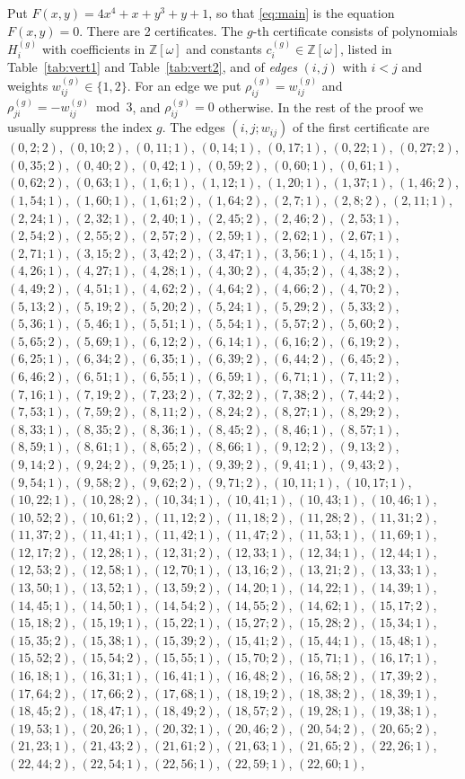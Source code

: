 \documentclass[11pt]{article}
\newcommand{\Z}{\mathbb{Z}}
\begin{document}
Put $F(x,y)=4x^{4}+x+y^{3}+y+1$, so that \eqref{eq:main} is the equation $F(x,y)=0$. There are 2 certificates. The $g$-th certificate consists of polynomials $H^{(g)}_i$ with coefficients in $\Z[\omega]$ and constants $c^{(g)}_i\in\Z[\omega]$, listed in Table~\ref{tab:vert1} and Table~\ref{tab:vert2}, and of \emph{edges} $(i,j)$ with $i<j$ and weights $w^{(g)}_{ij}\in\{1,2\}$. For an edge we put $\rho^{(g)}_{ij}=w^{(g)}_{ij}$ and $\rho^{(g)}_{ji}=-w^{(g)}_{ij}\bmod3$, and $\rho^{(g)}_{ij}=0$ otherwise. In the rest of the proof we usually suppress the index $g$.
The edges $(i,j;w_{ij})$ of the first certificate are $(0,2;2)$, $(0,10;2)$, $(0,11;1)$, $(0,14;1)$, $(0,17;1)$, $(0,22;1)$, $(0,27;2)$, $(0,35;2)$, $(0,40;2)$, $(0,42;1)$, $(0,59;2)$, $(0,60;1)$, $(0,61;1)$, $(0,62;2)$, $(0,63;1)$, $(1,6;1)$, $(1,12;1)$, $(1,20;1)$, $(1,37;1)$, $(1,46;2)$, $(1,54;1)$, $(1,60;1)$, $(1,61;2)$, $(1,64;2)$, $(2,7;1)$, $(2,8;2)$, $(2,11;1)$, $(2,24;1)$, $(2,32;1)$, $(2,40;1)$, $(2,45;2)$, $(2,46;2)$, $(2,53;1)$, $(2,54;2)$, $(2,55;2)$, $(2,57;2)$, $(2,59;1)$, $(2,62;1)$, $(2,67;1)$, $(2,71;1)$, $(3,15;2)$, $(3,42;2)$, $(3,47;1)$, $(3,56;1)$, $(4,15;1)$, $(4,26;1)$, $(4,27;1)$, $(4,28;1)$, $(4,30;2)$, $(4,35;2)$, $(4,38;2)$, $(4,49;2)$, $(4,51;1)$, $(4,62;2)$, $(4,64;2)$, $(4,66;2)$, $(4,70;2)$, $(5,13;2)$, $(5,19;2)$, $(5,20;2)$, $(5,24;1)$, $(5,29;2)$, $(5,33;2)$, $(5,36;1)$, $(5,46;1)$, $(5,51;1)$, $(5,54;1)$, $(5,57;2)$, $(5,60;2)$, $(5,65;2)$, $(5,69;1)$, $(6,12;2)$, $(6,14;1)$, $(6,16;2)$, $(6,19;2)$, $(6,25;1)$, $(6,34;2)$, $(6,35;1)$, $(6,39;2)$, $(6,44;2)$, $(6,45;2)$, $(6,46;2)$, $(6,51;1)$, $(6,55;1)$, $(6,59;1)$, $(6,71;1)$, $(7,11;2)$, $(7,16;1)$, $(7,19;2)$, $(7,23;2)$, $(7,32;2)$, $(7,38;2)$, $(7,44;2)$, $(7,53;1)$, $(7,59;2)$, $(8,11;2)$, $(8,24;2)$, $(8,27;1)$, $(8,29;2)$, $(8,33;1)$, $(8,35;2)$, $(8,36;1)$, $(8,45;2)$, $(8,46;1)$, $(8,57;1)$, $(8,59;1)$, $(8,61;1)$, $(8,65;2)$, $(8,66;1)$, $(9,12;2)$, $(9,13;2)$, $(9,14;2)$, $(9,24;2)$, $(9,25;1)$, $(9,39;2)$, $(9,41;1)$, $(9,43;2)$, $(9,54;1)$, $(9,58;2)$, $(9,62;2)$, $(9,71;2)$, $(10,11;1)$, $(10,17;1)$, $(10,22;1)$, $(10,28;2)$, $(10,34;1)$, $(10,41;1)$, $(10,43;1)$, $(10,46;1)$, $(10,52;2)$, $(10,61;2)$, $(11,12;2)$, $(11,18;2)$, $(11,28;2)$, $(11,31;2)$, $(11,37;2)$, $(11,41;1)$, $(11,42;1)$, $(11,47;2)$, $(11,53;1)$, $(11,69;1)$, $(12,17;2)$, $(12,28;1)$, $(12,31;2)$, $(12,33;1)$, $(12,34;1)$, $(12,44;1)$, $(12,53;2)$, $(12,58;1)$, $(12,70;1)$, $(13,16;2)$, $(13,21;2)$, $(13,33;1)$, $(13,50;1)$, $(13,52;1)$, $(13,59;2)$, $(14,20;1)$, $(14,22;1)$, $(14,39;1)$, $(14,45;1)$, $(14,50;1)$, $(14,54;2)$, $(14,55;2)$, $(14,62;1)$, $(15,17;2)$, $(15,18;2)$, $(15,19;1)$, $(15,22;1)$, $(15,27;2)$, $(15,28;2)$, $(15,34;1)$, $(15,35;2)$, $(15,38;1)$, $(15,39;2)$, $(15,41;2)$, $(15,44;1)$, $(15,48;1)$, $(15,52;2)$, $(15,54;2)$, $(15,55;1)$, $(15,70;2)$, $(15,71;1)$, $(16,17;1)$, $(16,18;1)$, $(16,31;1)$, $(16,41;1)$, $(16,48;2)$, $(16,58;2)$, $(17,39;2)$, $(17,64;2)$, $(17,66;2)$, $(17,68;1)$, $(18,19;2)$, $(18,38;2)$, $(18,39;1)$, $(18,45;2)$, $(18,47;1)$, $(18,49;2)$, $(18,57;2)$, $(19,28;1)$, $(19,38;1)$, $(19,53;1)$, $(20,26;1)$, $(20,32;1)$, $(20,46;2)$, $(20,54;2)$, $(20,65;2)$, $(21,23;1)$, $(21,43;2)$, $(21,61;2)$, $(21,63;1)$, $(21,65;2)$, $(22,26;1)$, $(22,44;2)$, $(22,54;1)$, $(22,56;1)$, $(22,59;1)$, $(22,60;1)$, 
\end{document}
